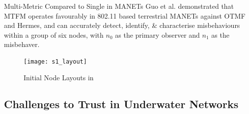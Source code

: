 \documentclass{beamer}
\begin{document}
\begin{frame}{Multi-Metric Compared to Single in MANETs}
  Guo et al.\cite{Guo11} demonstrated that MTFM operates favourably in 802.11 based terrestrial MANETs against OTMF and Hermes, and can accurately detect, identify, \& characterise misbehaviours within a group of six nodes, with $n_0$ as the primary observer and $n_1$ as the misbehaver.

  \begin{figure}[h]
    \begin{center}
      \texttt{[image: s1\_layout]}
    \end{center}
    \caption{Initial Node Layouts in \cite{Guo11}}
    \label{fig:node_layout}
  \end{figure}
  \end{frame}

\subsection{Challenges to Trust in Underwater Networks}
\end{document}
